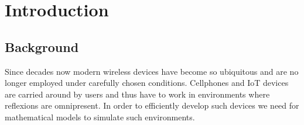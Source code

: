
\chapter{Introduction}

\section{Background}

Since decades now modern wireless devices have become so ubiquitous and are no longer employed under carefully chosen conditions. Cellphones and IoT devices are carried around by users and thus have to work in environments where reflexions are omnipresent. In order to efficiently develop such devices we need for mathematical models to simulate such environments.
